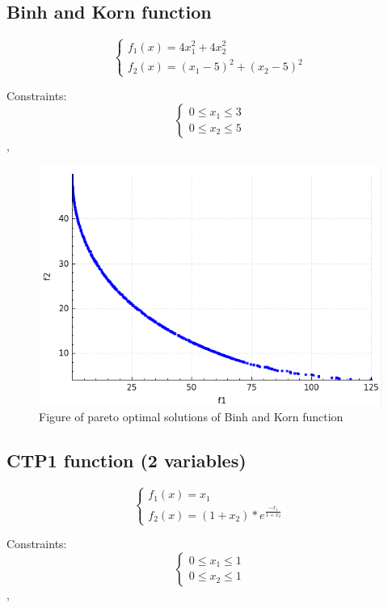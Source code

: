 \documentclass[a4paper, 11pt]{article}
\begin{document}
	\subsection{Binh and Korn function} \label{BinhAndKorn}
	$$\begin{cases}
		f_{1}(x)=4x_{1}^{2}+4x_{2}^{2}\\
		f_{2}(x)=(x_{1}-5)^{2}+(x_{2}-5)^{2}
	\end{cases}$$
		
	Constraints:
	$$\begin{cases}
		0 \leq x_{1} \leq 3\\
		0 \leq x_{2} \leq 5
	\end{cases}$$,

	\begin{figure}[H]
	\centering
	\includegraphics[scale=0.4]{binh_korn}
	\caption{Figure of pareto optimal solutions of Binh and Korn function}
	\label{fig:binh_korn}
	\end{figure}
	
	\subsection{CTP1 function (2 variables)}
	$$\begin{cases}
		f_{1}(x)=x_{1}\\
		f_{2}(x)=(1+x_{2})*e^{\frac{-x_{1}}{1+x_{2}}}
	\end{cases}$$
		
	Constraints:
	$$\begin{cases}
		0 \leq x_{1} \leq 1\\
		0 \leq x_{2} \leq 1
	\end{cases}$$,
	
\end{document}
